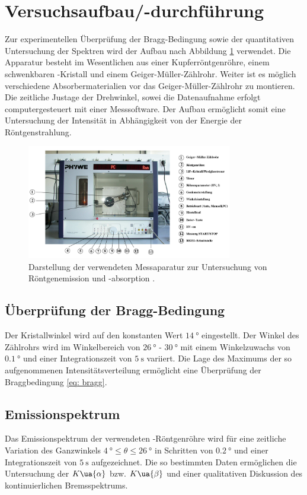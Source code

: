 \section{Versuchsaufbau/-durchführung}
Zur experimentellen Überprüfung der Bragg-Bedingung sowie der quantitativen Untersuchung der Spektren wird der Aufbau nach Abbildung
\ref{fig: aufbau} verwendet. Die Apparatur besteht im Wesentlichen aus einer Kupferröntgenröhre, einem schwenkbaren -Kristall
und einem Geiger-Müller-Zählrohr. Weiter ist es möglich verschiedene Absorbermaterialien vor das Geiger-Müller-Zählrohr
zu montieren. Die zeitliche Justage der Drehwinkel, sowei die Datenaufnahme erfolgt computergesteuert mit einer
Messsoftware. Der Aufbau ermöglicht somit eine Untersuchung der Intensität in Abhängigkeit von der Energie
der Röntgenstrahlung.
\begin{figure}
  \centering
  \includegraphics[width = 0.8\textwidth]{pics/aufbau.png}
  \caption{Darstellung der verwendeten Messaparatur zur Untersuchung von Röntgenemission und -absorption \cite{}.}
  \label{fig: aufbau}
\end{figure}
\subsection{Überprüfung der Bragg-Bedingung}
Der Kristallwinkel wird auf den konstanten Wert $\SI{14}{\degree}$ eingestellt. Der Winkel des Zählrohrs wird im Winkelbereich
von $\SI{26}{\degree}$ - $\SI{30}{\degree}$ mit einem Winkelzuwachs von $\SI{0.1}{\degree}$ und einer Integrationszeit
von $\SI{5}{\second}$ variiert. Die Lage des Maximums der so aufgenommenen Intensitätsverteilung ermöglicht eine Überprüfung
der Braggbedingung \ref{eq: bragg}.

\subsection{Emissionspektrum}
Das Emissionspektrum der verwendeten -Röntgenröhre wird für eine zeitliche Variation des Ganzwinkels
$\SI{4}{\degree} \leq \theta \leq \SI{26}{\degree}$ in Schritten von $\SI{0.2}{\degree}$ und einer Integrationszeit
von $\SI{5}{\second}$ aufgezeichnet. Die so bestimmten Daten ermöglichen die Untersuchung der $K\ua{\alpha}$ bzw.
$K\ua{\beta}$ und einer qualitativen Diskussion des kontinuierlichen Bremsspektrums.

